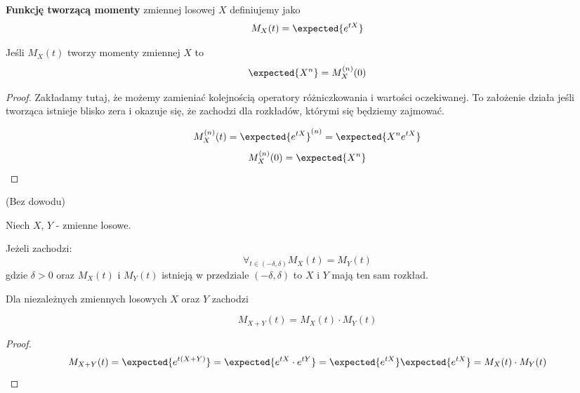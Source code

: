\begin{definition}
	\textbf{Funkcję tworzącą momenty} zmiennej losowej \( X \) definiujemy jako
	\[
		M_X(t) = \expected{e^{tX}}
	\]
\end{definition}

\begin{theorem}[Twierdzenie 4.1  P\&C]
	Jeśli \( M_X(t) \) tworzy momenty zmiennej \( X \) to
	\[
		\expected{X^n} = M_X^{(n)}(0)
	\]
\end{theorem}
\begin{proof}
	Zakładamy tutaj, że możemy zamieniać kolejnością operatory różniczkowania i wartości oczekiwanej.
	To założenie działa jeśli tworząca istnieje blisko zera i okazuje się, że zachodzi dla rozkładów, którymi się będziemy zajmować.

	\[
		M_X^{(n)}(t) = \expected{e^{tX}}^{(n)}
		= \expected{X^n e^{tX}}
	\]
	\[
		M_X^{(n)}(0) = \expected{X^n}
	\]
\end{proof}

\begin{theorem}
	\label{generating-function-equality}
	(Bez dowodu)

	Niech \( X \), \( Y \) - zmienne losowe.

	Jeżeli zachodzi:
	\[
		\forall_{t \in ( -\delta, \delta )} M_X(t) = M_Y(t)
	\]
	gdzie \( \delta > 0 \) oraz \( M_X(t) \) i \( M_Y(t) \) istnieją w przedziale \( ( -\delta, \delta ) \) to \( X \) i \( Y \) mają ten sam rozkład.
\end{theorem}

\begin{theorem}[Twierdzenie 4.3 P\&C]
	Dla niezależnych zmiennych losowych \( X \) oraz \( Y \) zachodzi

	\[
		M_{X + Y}(t) = M_X(t) \cdot M_Y(t)
	\]
\end{theorem}
\begin{proof}
	\[
		M_{X + Y}(t) = \expected{e^{t(X + Y)}} = \expected{e^{tX}\cdot e^{tY}} = \expected{e^{tX}}\expected{e^{tX}} = M_X(t) \cdot M_Y(t)
	\]
\end{proof}
